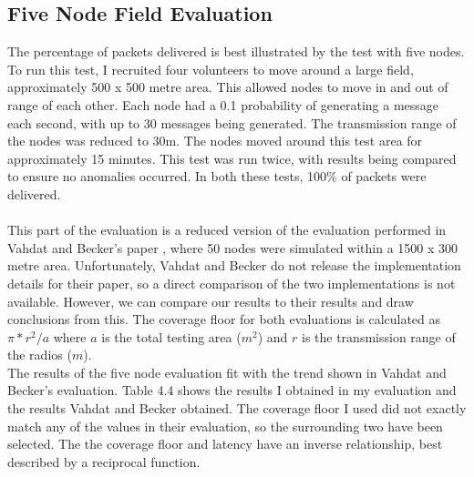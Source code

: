 \documentclass[12pt,a4paper]{report}
\begin{document}
\subsection{Five Node Field Evaluation}
The percentage of packets delivered is best illustrated by the test with five nodes. To run this test, I recruited four volunteers to move around a large field, approximately 500 x 500 metre area. This allowed nodes to move in and out of range of each other. Each node had a 0.1 probability of generating a message each second, with up to 30 messages being generated. The transmission range of the nodes was reduced to 30m. The nodes moved around this test area for approximately 15 minutes. This test was run twice, with results being compared to ensure no anomalies occurred. In both these tests, 100\% of packets were delivered. \\ \\
This part of the evaluation is a reduced version of the evaluation performed in Vahdat and Becker's paper \cite{epidemic}, where 50 nodes were simulated within a 1500 x 300 metre area. Unfortunately, Vahdat and Becker do not release the implementation details for their paper, so a direct comparison of the two implementations is not available. However, we can compare our results to their results and draw conclusions from this. The coverage floor for both evaluations is calculated as $\pi * r^2 / a$ where $a$ is the total testing area ($m^2$) and $r$ is the transmission range of the radios ($m$).  \\ 
The results of the five node evaluation fit with the trend shown in Vahdat and Becker's evaluation. Table 4.4 shows the results I obtained in my evaluation and the results Vahdat and Becker obtained. The coverage floor I used did not exactly match any of the values in their evaluation, so the surrounding two have been selected. The the coverage floor and latency have an inverse relationship, best described by a reciprocal function.

\begin{table}[h]
\begin{center}
\end{center}
\caption{Results from the five node evaluation and comparison to other papers}
\end{table}  
\end{document}
